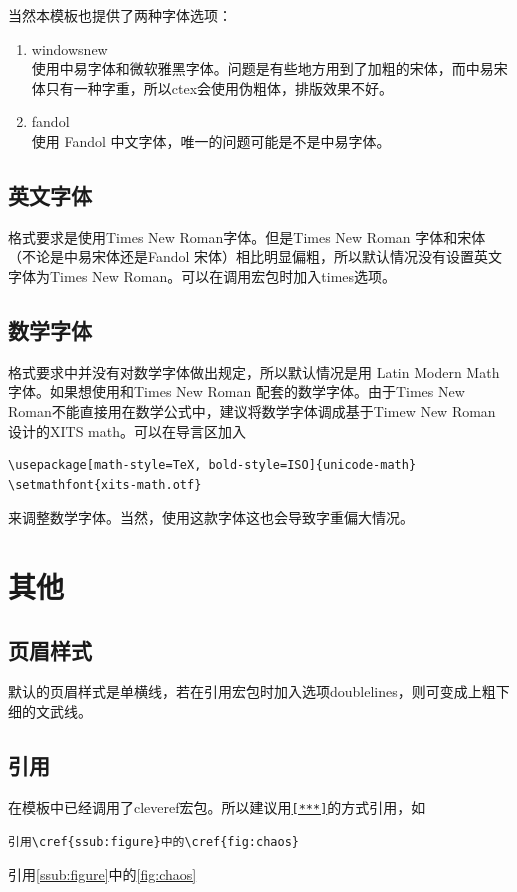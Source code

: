 \documentclass{LZU}
\newcommand{\package}[1]{{\sffamily #1}}
\begin{document}
当然本模板也提供了两种字体选项：
\begin{enumerate}
    \item windowsnew\\
        使用中易字体和微软雅黑字体。问题是有些地方用到了加粗的宋体，而中易宋体只有一种字重，所以\package{ctex}会使用伪粗体，排版效果不好。
    \item fandol\\
        使用 Fandol 中文字体，唯一的问题可能是不是中易字体。
\end{enumerate}
\subsection{英文字体}
格式要求是使用Times New Roman字体。但是Times New Roman 字体和宋体（不论是中易宋体还是Fandol 宋体）相比明显偏粗，所以默认情况没有设置英文字体为Times New Roman。可以在调用宏包时加入times选项。
\subsection{数学字体}
\label{subsec:math_font}
格式要求中并没有对数学字体做出规定，所以默认情况是用 Latin Modern Math 字体。如果想使用和Times New Roman 配套的数学字体。由于Times New Roman不能直接用在数学公式中，建议将数学字体调成基于Timew New Roman 设计的XITS math。可以在导言区加入
\begin{verbatim}
\usepackage[math-style=TeX, bold-style=ISO]{unicode-math}
\setmathfont{xits-math.otf}
\end{verbatim}
来调整数学字体。当然，使用这款字体这也会导致字重偏大情况。

\section{其他}
\subsection{页眉样式}
默认的页眉样式是单横线，若在引用宏包时加入选项doublelines，则可变成上粗下细的文武线。
\subsection{引用}
在模板中已经调用了\package{cleveref}宏包。所以建议用\texttt{\cref{***}}的方式引用，如
\begin{verbatim}
引用\cref{ssub:figure}中的\cref{fig:chaos}
\end{verbatim}
引用\cref{ssub:figure}中的\cref{fig:chaos}
\end{document}
